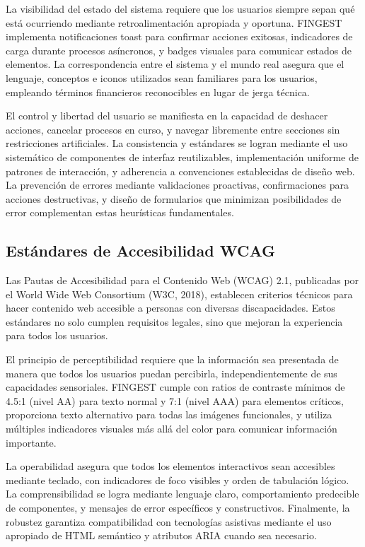 \documentclass[12pt,a4paper,oneside]{article}
\begin{document}
La visibilidad del estado del sistema requiere que los usuarios siempre sepan qué está ocurriendo mediante retroalimentación apropiada y oportuna. FINGEST implementa notificaciones toast para confirmar acciones exitosas, indicadores de carga durante procesos asíncronos, y badges visuales para comunicar estados de elementos. La correspondencia entre el sistema y el mundo real asegura que el lenguaje, conceptos e iconos utilizados sean familiares para los usuarios, empleando términos financieros reconocibles en lugar de jerga técnica.

El control y libertad del usuario se manifiesta en la capacidad de deshacer acciones, cancelar procesos en curso, y navegar libremente entre secciones sin restricciones artificiales. La consistencia y estándares se logran mediante el uso sistemático de componentes de interfaz reutilizables, implementación uniforme de patrones de interacción, y adherencia a convenciones establecidas de diseño web. La prevención de errores mediante validaciones proactivas, confirmaciones para acciones destructivas, y diseño de formularios que minimizan posibilidades de error complementan estas heurísticas fundamentales.

\subsection{Estándares de Accesibilidad WCAG}

Las Pautas de Accesibilidad para el Contenido Web (WCAG) 2.1, publicadas por el World Wide Web Consortium (W3C, 2018), establecen criterios técnicos para hacer contenido web accesible a personas con diversas discapacidades. Estos estándares no solo cumplen requisitos legales, sino que mejoran la experiencia para todos los usuarios.

El principio de perceptibilidad requiere que la información sea presentada de manera que todos los usuarios puedan percibirla, independientemente de sus capacidades sensoriales. FINGEST cumple con ratios de contraste mínimos de 4.5:1 (nivel AA) para texto normal y 7:1 (nivel AAA) para elementos críticos, proporciona texto alternativo para todas las imágenes funcionales, y utiliza múltiples indicadores visuales más allá del color para comunicar información importante.

La operabilidad asegura que todos los elementos interactivos sean accesibles mediante teclado, con indicadores de foco visibles y orden de tabulación lógico. La comprensibilidad se logra mediante lenguaje claro, comportamiento predecible de componentes, y mensajes de error específicos y constructivos. Finalmente, la robustez garantiza compatibilidad con tecnologías asistivas mediante el uso apropiado de HTML semántico y atributos ARIA cuando sea necesario.
\end{document}
